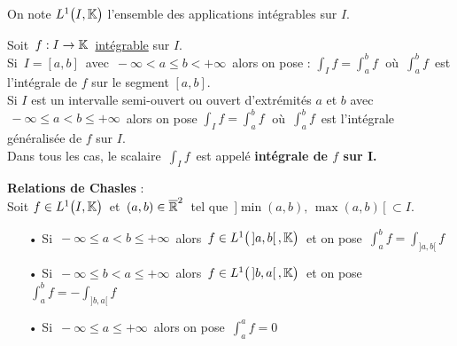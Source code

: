 On note \(L^1\bigl(I,\mathbb{K}\bigr)\) l'ensemble des applications intégrables sur $I$.

\vspace{1.5cm}

Soit \(\,f:I\to \mathbb{K}\,\) \underline{intégrable} sur $I$.\vspace{-0.2cm}\\
Si \(\,I=[a,b]\,\) avec \(\,-\infty<a\leq b<+\infty\,\) alors on pose : \(\!\displaystyle \int_{I}f=\int_{a}^{b}\!f\;\) où \(\,\displaystyle\int_{a}^{b}\!f\,\) est l'intégrale de $f$ sur le segment \([a,b]\).\vspace{0.1cm}\\
Si $I$ est un intervalle semi-ouvert ou ouvert d'extrémités $a$ et $b$ avec \(\,-\infty\leq a <b\leq+\infty\,\) alors on pose \(\!\displaystyle \int_{I}f=\int_{a}^{b}\!f\;\) où \(\,\displaystyle\int_{a}^{b}\!f\,\) est l'intégrale généralisée de $f$ sur $I$.\vspace{0.1cm}\\
Dans tous les cas, le scalaire \(\,\displaystyle\int_I f\,\) est appelé \textbf{intégrale de $f$ sur I.}

\newpage

\textbf{Relations de Chasles} : \vspace{0.2cm}\\
Soit \(f\in L^1\bigl(I,\mathbb{K}\bigr)\,\) et \(\,(a,b)\in\overline{\mathbb{R}}^2\:\) tel que \(\,]\min(a,b),\,\max(a,b)\,[\ \subset I.\)
\begin{itemize}[leftmargin=1.5cm]
    \item[•] Si \(\,-\infty\leq a<b \leq+\infty\,\) alors \(\,f\in L^1\bigl(\,]a,b[\,,\mathbb{K}\bigr)\,\) et on pose \(\,\displaystyle \int_{a}^{b}\!f=\int_{]a,b[}f\)
    
    \item[•] Si \(\,-\infty\leq b<a \leq+\infty\,\) alors \(\,f\in L^1\bigl(\,]b,a[\,,\mathbb{K}\bigr)\,\) et on pose \(\,\displaystyle \int_{a}^{b}\!f=-\!\int_{]b,a[}f\)\vspace{-0.2cm}
    
    \item[•] Si \(\,-\infty\leq a \leq+\infty\,\) alors on pose \(\,\displaystyle\int_{a}^{a}\!f=0\)
\end{itemize}

\vspace{1.5cm}

